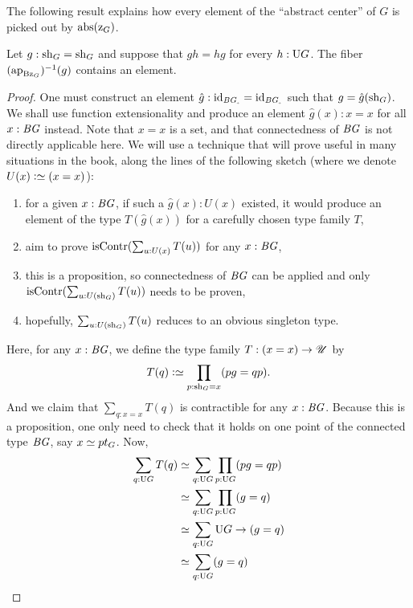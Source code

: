 The following result explains how every element of the ``abstract
center'' of $G$ is picked out by $\mathrm{abs}{(\mathrm z_{{G}})}$.
\begin{lemma}
  \label{lemma:center-inc-surj-on-paths}%
  Let $g:\mathrm{sh}_G = \mathrm{sh}_G$ and suppose that $gh=hg$ for every
  $h:\mathrm{U} G$. The fiber $\inv{(\ap {\B\grpcenterinc G})}(g)$ contains
  an element.
\end{lemma}
\begin{proof}
  One must construct an element $\hat g:\id_{\BG_\div} = \id_{\BG_\div}$ such that
  $g=\hat g(\mathrm{sh}_G)$. We shall use function extensionality and produce
  an element $\hat g(x):x=x$ for all $x:\mathit{B}\mathit{G}$ instead. Note that $x=x$ is
  a set, and that connectedness of $\mathit{B}\mathit{G}$ is not directly applicable
  here. We will use a technique that will prove useful in many
  situations in the book, along the lines of the following sketch
  (where we denote $U(x)\defequi (x=x)$):
  \begin{enumerate}
  \item for a given $x:\mathit{B}\mathit{G}$, if such a $\hat g(x):U(x)$ existed, it would
    produce an element of the type $T(\hat g(x))$ for a carefully chosen type
    family $T$,
  \item aim to prove $\iscontr(\sum_{u:U(x)}T(u))$ for any $x:\mathit{B}\mathit{G}$,
  \item this is a proposition, so connectedness of $\mathit{B}\mathit{G}$ can be applied
    and only $\iscontr(\sum_{u:U(\sh_G)}T(u))$ needs to be proven,
  \item hopefully, $\sum_{u:U(\mathrm{sh}_G)}T(u)$ reduces to an obvious
    singleton type.
  \end{enumerate}
  Here, for any $x:\mathit{B}\mathit{G}$, we define the type family $T: (x=x) \to {\mathscr{U}}$
  by
  \begin{displaymath}
    T(q) \defequi \prod_{p:\sh_G=x} (pg=qp).
  \end{displaymath}
  And we claim that $\sum_{q:x=x}T(q)$ is contractible for any
  $x:\mathit{B}\mathit{G}$. Because this is a proposition, one only need to check that
  it holds on one point of the connected type $\mathit{B}\mathit{G}$, say
  $x\jdeq pt_G$. Now,
  \begin{displaymath}%
    \begin{aligned}
      \sum_{q:\USym G}T(q) &\jdeq
      \sum_{q:\USym G}\prod_{p:\USym G}(pg=qp)
      \\
      &\weq \sum_{q:\USym G}\prod_{p:\USym G}(g=q)
      \\
      &\weq \sum_{q:\USym G}\USym G\to (g=q)
      \\
      &\weq \sum_{q:\USym G} (g=q)

\end{aligned}
\end{displaymath}
\end{proof}
